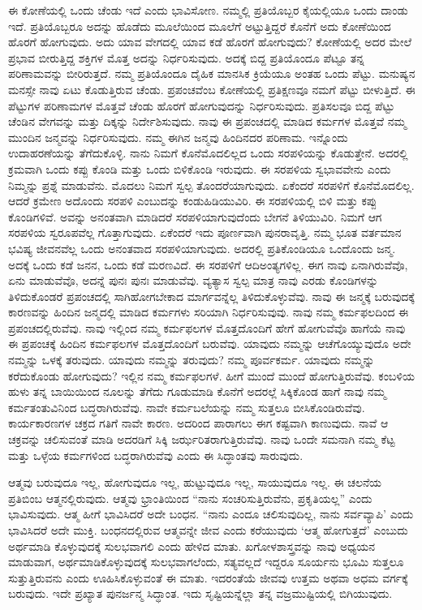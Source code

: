 ಈ ಕೋಣೆಯಲ್ಲಿ ಒಂದು ಚೆಂಡು ಇದೆ ಎಂದು ಭಾವಿಸೋಣ. ನಮ್ಮಲ್ಲಿ ಪ್ರತಿಯೊಬ್ಬರ ಕೈಯಲ್ಲಿಯೂ ಒಂದು ದಾಂಡು ಇದೆ. ಪ್ರತಿಯೊಬ್ಬರೂ ಅದನ್ನು ಹೊಡೆದು ಮೂಲೆಯಿಂದ ಮೂಲೆಗೆ ಅಟ್ಟುತ್ತಿದ್ದರೆ ಕೊನೆಗೆ ಅದು ಕೋಣೆಯಿಂದ ಹೊರಗೆ ಹೋಗುವುದು. ಅದು ಯಾವ ವೇಗದಲ್ಲಿ ಯಾವ ಕಡೆ ಹೊರಗೆ ಹೋಗುವುದು? ಕೋಣೆಯಲ್ಲಿ ಅದರ ಮೇಲೆ ಪ್ರಭಾವ ಬೀರುತ್ತಿದ್ದ ಶಕ್ತಿಗಳ ಮೊತ್ತ ಅದನ್ನು ನಿರ್ಧರಿಸುವುದು. ಅದಕ್ಕೆ ಬಿದ್ದ ಪ್ರತಿಯೊಂದೂ ಪೆಟ್ಟೂ ತನ್ನ ಪರಿಣಾಮವನ್ನು ಬೀರಿರುತ್ತದೆ. ನಮ್ಮ ಪ್ರತಿಯೊಂದೂ ದೈಹಿಕ ಮಾನಸಿಕ ಕ್ರಿಯೆಯೂ ಅಂತಹ ಒಂದು ಪೆಟ್ಟು. ಮನುಷ್ಯನ ಮನಸ್ಸೇ ನಾವು ಏಟು ಕೊಡುತ್ತಿರುವ ಚೆಂಡು. ಪ್ರಪಂಚವೆಂಬ ಕೋಣೆಯಲ್ಲಿ ಪ್ರತಿಕ್ಷಣವೂ ನಮಗೆ ಪೆಟ್ಟು ಬೀಳುತ್ತಿದೆ. ಈ ಪೆಟ್ಟುಗಳ ಪರಿಣಾಮಗಳ ಮೊತ್ತವೆ ಚೆಂಡು ಹೊರಗೆ ಹೋಗುವುದನ್ನು ನಿರ್ಧರಿಸುವುದು. ಪ್ರತಿಸಲವೂ ಬಿದ್ದ ಪೆಟ್ಟು ಚೆಂಡಿನ ವೇಗವನ್ನು ಮತ್ತು ದಿಕ್ಕನ್ನು ನಿರ್ದೇಶಿಸುವುದು. ನಾವು ಈ ಪ್ರಪಂಚದಲ್ಲಿ ಮಾಡಿದ ಕರ್ಮಗಳ ಮೊತ್ತವೆ ನಮ್ಮ ಮುಂದಿನ ಜನ್ಮವನ್ನು ನಿರ್ಧರಿಸುವುದು. ನಮ್ಮ ಈಗಿನ ಜನ್ಮವು ಹಿಂದಿನದರ ಪರಿಣಾಮ. ಇನ್ನೊಂದು ಉದಾಹರಣೆಯನ್ನು ತೆಗೆದುಕೊಳ್ಳಿ. ನಾನು ನಿಮಗೆ ಕೊನೆಮೊದಲಿಲ್ಲದ ಒಂದು ಸರಪಳಿಯನ್ನು ಕೊಡುತ್ತೇನೆ. ಅದರಲ್ಲಿ ಕ್ರಮವಾಗಿ ಒಂದು ಕಪ್ಪು ಕೊಂಡಿ ಮತ್ತು ಒಂದು ಬಿಳಿಕೊಂಡಿ ಇರುವುದು. ಈ ಸರಪಳಿಯ ಸ್ವಭಾವವೇನು ಎಂದು ನಿಮ್ಮನ್ನು ಪ್ರಶ್ನೆ ಮಾಡುವೆನು. ಮೊದಲು ನಿಮಗೆ ಸ್ವಲ್ಪ ತೊಂದರೆಯಾಗುವುದು. ಏಕೆಂದರೆ ಸರಪಳಿಗೆ ಕೊನೆಮೊದಲಿಲ್ಲ. ಆದರೆ ಕ್ರಮೇಣ ಅದೊಂದು ಸರಪಳಿ ಎಂಬುದನ್ನು ಕಂಡುಹಿಡಿಯುವಿರಿ. ಈ ಸರಪಳಿಯಲ್ಲಿ ಬಿಳಿ ಮತ್ತು ಕಪ್ಪು ಕೊಂಡಿಗಳಿವೆ. ಅವನ್ನು ಅನಂತವಾಗಿ ಮಾಡಿದರೆ ಸರಪಳಿಯಾಗುವುದೆಂದು ಬೇಗನೆ ತಿಳಿಯುವಿರಿ. ನಿಮಗೆ ಆಗ ಸರಪಳಿಯ ಸ್ವರೂಪವೆಲ್ಲ ಗೊತ್ತಾಗುವುದು. ಏಕೆಂದರೆ ಇದು ಪೂರ್ಣವಾಗಿ ಪುನರಾವೃತ್ತಿ. ನಮ್ಮ ಭೂತ ವರ್ತಮಾನ ಭವಿಷ್ಯ ಜೀವನವೆಲ್ಲ ಒಂದು ಅನಂತವಾದ ಸರಪಳಿಯಾಗುವುದು. ಅದರಲ್ಲಿ ಪ್ರತಿಕೊಂಡಿಯೂ ಒಂದೊಂದು ಜನ್ಮ. ಅದಕ್ಕೆ ಒಂದು ಕಡೆ ಜನನ, ಒಂದು ಕಡೆ ಮರಣವಿದೆ. ಈ ಸರಪಳಿಗೆ ಆದಿಅಂತ್ಯಗಳಿಲ್ಲ. ಈಗ ನಾವು ಏನಾಗಿರುವೆವೊ, ಏನು ಮಾಡುವೆವೊ, ಅದನ್ನೆ ಪುನಃ ಪುನಃ ಮಾಡುವೆವು. ವ್ಯತ್ಯಾಸ ಸ್ವಲ್ಪ ಮಾತ್ರ ನಾವು ಎರಡು ಕೊಂಡಿಗಳನ್ನು ತಿಳಿದುಕೊಂಡರೆ ಪ್ರಪಂಚದಲ್ಲಿ ಸಾಗಿಹೋಗಬೇಕಾದ ಮಾರ್ಗವನ್ನೆಲ್ಲ ತಿಳಿದುಕೊಳ್ಳುವೆವು. ನಾವು ಈ ಜನ್ಮಕ್ಕೆ ಬರುವುದಕ್ಕೆ ಕಾರಣವನ್ನು ಹಿಂದಿನ ಜನ್ಮದಲ್ಲಿ ಮಾಡಿದ ಕರ್ಮಗಳು ಸರಿಯಾಗಿ ನಿರ್ಧರಿಸುವುವು. ನಾವು ನಮ್ಮ ಕರ್ಮಫಲದಿಂದ ಈ ಪ್ರಪಂಚದಲ್ಲಿರುವೆವು. ನಾವು ಇಲ್ಲಿಂದ ನಮ್ಮ ಕರ್ಮಫಲಗಳ ಮೊತ್ತದೊಂದಿಗೆ ಹೇಗೆ ಹೋಗುವೆವೊ ಹಾಗೆಯೆ ನಾವು ಈ ಪ್ರಪಂಚಕ್ಕೆ ಹಿಂದಿನ ಕರ್ಮಫಲಗಳ ಮೊತ್ತದೊಂದಿಗೆ ಬರುವೆವು. ಯಾವುದು ನಮ್ಮನ್ನು ಆಚೆಗೊಯ್ಯುವುದೊ ಅದೇ ನಮ್ಮನ್ನು ಒಳಕ್ಕೆ ತರುವುದು. ಯಾವುದು ನಮ್ಮನ್ನು ತರುವುದು? ನಮ್ಮ ಪೂರ್ವಕರ್ಮ. ಯಾವುದು ನಮ್ಮನ್ನು ಕರೆದುಕೊಂಡು ಹೋಗುವುದು? ಇಲ್ಲಿನ ನಮ್ಮ ಕರ್ಮಫಲಗಳೆ. ಹೀಗೆ ಮುಂದೆ ಮುಂದೆ ಹೋಗುತ್ತಿರುವೆವು. ಕಂಬಳಿಯ ಹುಳು ತನ್ನ ಬಾಯಿಯಿಂದ ನೂಲನ್ನು ತೆಗೆದು ಗೂಡುಮಾಡಿ ಕೊನೆಗೆ ಅದರಲ್ಲೆ ಸಿಕ್ಕಿಕೊಂಡ ಹಾಗೆ ನಾವು ನಮ್ಮ ಕರ್ಮತಂತುವಿನಿಂದ ಬದ್ಧರಾಗಿರುವೆವು. ನಾವೇ ಕರ್ಮಬಲೆಯನ್ನು ನಮ್ಮ ಸುತ್ತಲೂ ಬೀಸಿಕೊಂಡಿರುವೆವು. ಕಾರ್ಯಕಾರಣಗಳ ಚಕ್ರದ ಗತಿಗೆ ನಾವೇ ಕಾರಣ. ಅದರಿಂದ ಪಾರಾಗಲು ಈಗ ಕಷ್ಟವಾಗಿ ಕಾಣುವುದು. ನಾವೆ ಆ ಚಕ್ರವನ್ನು ಚಲಿಸುವಂತೆ ಮಾಡಿ ಅದರಡಿಗೆ ಸಿಕ್ಕಿ ಜರ್ಝರಿತರಾಗುತ್ತಿರುವೆವು. ನಾವು ಒಂದೇ ಸಮನಾಗಿ ನಮ್ಮ ಕೆಟ್ಟ ಮತ್ತು ಒಳ್ಳೆಯ ಕರ್ಮಗಳಿಂದ ಬದ್ಧರಾಗಿರುವೆವು ಎಂದು ಈ ಸಿದ್ಧಾಂತವು ಸಾರುವುದು.

ಆತ್ಮವು ಬರುವುದೂ ಇಲ್ಲ, ಹೋಗುವುದೂ ಇಲ್ಲ, ಹುಟ್ಟುವುದೂ ಇಲ್ಲ, ಸಾಯುವುದೂ ಇಲ್ಲ. ಈ ಚಲನೆಯ ಪ್ರತಿಬಿಂಬ ಆತ್ಮನಲ್ಲಿರುವುದು. ಆತ್ಮವು ಭ್ರಾಂತಿಯಿಂದ “ನಾನು ಸಂಚರಿಸುತ್ತಿರುವೆನು, ಪ್ರಕೃತಿಯಲ್ಲ” ಎಂದು ಭಾವಿಸುವುದು. ಆತ್ಮ ಹೀಗೆ ಭಾವಿಸಿದರೆ ಅದೇ ಬಂಧನ. “ನಾನು ಎಂದೂ ಚಲಿಸುವುದಿಲ್ಲ, ನಾನು ಸರ್ವವ್ಯಾಪಿ’ ಎಂದು ಭಾವಿಸಿದರೆ ಅದೇ ಮುಕ್ತಿ. ಬಂಧನದಲ್ಲಿರುವ ಆತ್ಮವನ್ನೇ ಜೀವ ಎಂದು ಕರೆಯುವುದು ‘ಆತ್ಮ ಹೋಗುತ್ತದೆ’ ಎಂಬುದು ಅರ್ಥಮಾಡಿ ಕೊಳ್ಳುವುದಕ್ಕೆ ಸುಲಭವಾಗಲಿ ಎಂದು ಹೇಳಿದ ಮಾತು. ಖಗೋಳಶಾಸ್ತ್ರವನ್ನು ನಾವು ಅಧ್ಯಯನ ಮಾಡುವಾಗ, ಅರ್ಥಮಾಡಿಕೊಳ್ಳುವುದಕ್ಕೆ ಸುಲಭವಾಗಲೆಂದು, ಸತ್ಯವಲ್ಲದೆ ಇದ್ದರೂ ಸೂರ್ಯನು ಭೂಮಿ ಸುತ್ತಲೂ ಸುತ್ತುತ್ತಿರುವನು ಎಂದು ಊಹಿಸಿಕೊಳ್ಳುವಂತೆ ಈ ಮಾತು. ಇದರಂತೆಯೆ ಜೀವವು ಉತ್ತಮ ಅಥವಾ ಅಧಮ ವರ್ಗಕ್ಕೆ ಬರುವುದು. ಇದೇ ಪ್ರಖ್ಯಾತ ಪುನರ್ಜನ್ಮ ಸಿದ್ಧಾಂತ. ಇದು ಸೃಷ್ಟಿಯನ್ನೆಲ್ಲಾ ತನ್ನ ವಜ್ರಮುಷ್ಟಿಯಲ್ಲಿ ಬಿಗಿಯುವುದು.

